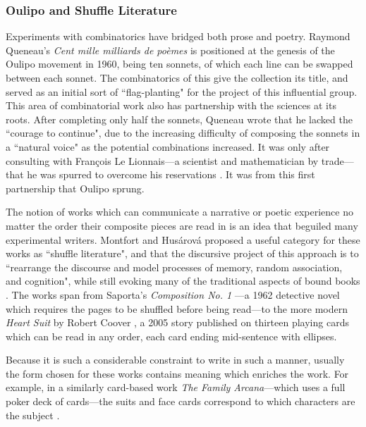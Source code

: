 \subsubsection{Oulipo and Shuffle Literature}\label{subsubsec:oulipo-and-shuffle-literature}

Experiments with combinatorics have bridged both prose and poetry. Raymond Queneau's \textit{Cent mille milliards de poèmes} \cite{mille_poems} is positioned at the genesis of the Oulipo movement in 1960, being ten sonnets, of which each line can be swapped between each sonnet. The combinatorics of this give the collection its title, and served as an initial sort of ``flag-planting" for the project of this influential group. This area of combinatorial work also has partnership with the sciences at its roots. After completing only half the sonnets, Queneau wrote that he lacked the ``courage to continue", due to the increasing difficulty of composing the sonnets in a ``natural voice" as the potential combinations increased. It was only after consulting with François Le Lionnais---a scientist and mathematician by trade---that he was spurred to overcome his reservations \cite{audiberti_charbonnier_1965}. It was from this first partnership that Oulipo sprung.

The notion of works which can communicate a narrative or poetic experience no matter the order their composite pieces are read in is an idea that beguiled many experimental writers. Montfort and Husárová proposed a useful category for these works as ``shuffle literature", and that the discursive project of this approach is to ``rearrange the discourse and model processes of memory, random association, and cognition", while still evoking many of the traditional aspects of bound books \cite{shuffle_2012}. The works span from Saporta's \textit{Composition No. 1} \cite{saporta1963composition}---a 1962 detective novel which requires the pages to be shuffled before being read---to the more modern \textit{Heart Suit} by Robert Coover \cite{coover2005heart}, a 2005 story published on thirteen playing cards which can be read in any order, each card ending mid-sentence with ellipses. 

Because it is such a considerable constraint to write in such a manner, usually the form chosen for these works contains meaning which enriches the work. For example, in a similarly card-based work \textit{The Family Arcana}---which uses a full poker deck of cards---the suits and face cards correspond to which characters are the subject \cite{short_card_deck}.


